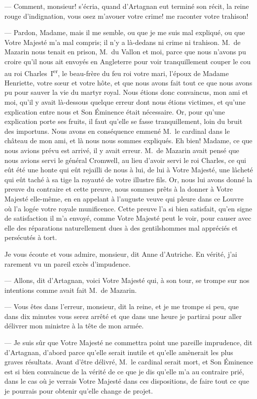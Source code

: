 — Comment, monsieur! s'écria, quand d'Artagnan eut terminé son récit, la reine rouge d'indignation, vous osez m'avouer votre crime! me raconter votre trahison!

— Pardon, Madame, mais il me semble, ou que je me suis mal expliqué, ou que Votre Majesté m'a mal compris; il n'y a là-dedans ni crime ni trahison. M.~de Mazarin nous tenait en prison, M.~du Vallon et moi, parce que nous n'avons pu croire qu'il nous ait envoyés en Angleterre pour voir tranquillement couper le cou au roi Charles~I\textsuperscript{er}, le beau-frère du feu roi votre mari, l'époux de Madame Henriette, votre sœur et votre hôte, et que nous avons fait tout ce que nous avons pu pour sauver la vie du martyr royal. Nous étions donc convaincus, mon ami et moi, qu'il y avait là-dessous quelque erreur dont nous étions victimes, et qu'une explication entre nous et Son Éminence était nécessaire. Or, pour qu'une explication porte ses fruits, il faut qu'elle se fasse tranquillement, loin du bruit des importuns. Nous avons en conséquence emmené M.~le cardinal dans le château de mon ami, et là nous nous sommes expliqués. Eh bien! Madame, ce que nous avions prévu est arrivé, il y avait erreur. M.~de Mazarin avait pensé que nous avions servi le général Cromwell, au lieu d'avoir servi le roi Charles, ce qui eût été une honte qui eût rejailli de nous à lui, de lui à Votre Majesté, une lâcheté qui eût taché à sa tige la royauté de votre illustre fils. Or, nous lui avons donné la preuve du contraire et cette preuve, nous sommes prêts à la donner à Votre Majesté elle-même, en en appelant à l'auguste veuve qui pleure dans ce Louvre où l'a logée votre royale munificence. Cette preuve l'a si bien satisfait, qu'en signe de satisfaction il m'a envoyé, comme Votre Majesté peut le voir, pour causer avec elle des réparations naturellement dues à des gentilshommes mal appréciés et persécutés à tort.

Je vous écoute et vous admire, monsieur, dit Anne d'Autriche. En vérité, j'ai rarement vu un pareil excès d'impudence.

— Allons, dit d'Artagnan, voici Votre Majesté qui, à son tour, se trompe sur nos intentions comme avait fait M.~de Mazarin.

— Vous êtes dans l'erreur, monsieur, dit la reine, et je me trompe si peu, que dans dix minutes vous serez arrêté et que dans une heure je partirai pour aller délivrer mon ministre à la tête de mon armée.

— Je suis sûr que Votre Majesté ne commettra point une pareille imprudence, dit d'Artagnan, d'abord parce qu'elle serait inutile et qu'elle amènerait les plus graves résultats. Avant d'être délivré, M.~le cardinal serait mort, et Son Éminence est si bien convaincue de la vérité de ce que je dis qu'elle m'a au contraire prié, dans le cas où je verrais Votre Majesté dans ces dispositions, de faire tout ce que je pourrais pour obtenir qu'elle change de projet.

